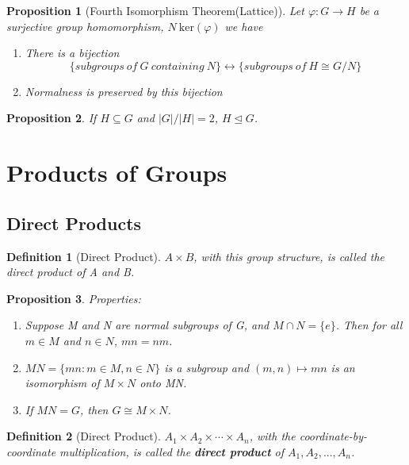\documentclass[12pt]{article}
\newtheorem{definition}{Definition}[subsection]
\newtheorem{proposition}{Proposition}[subsection]
\begin{document}
      \begin{proposition}[Fourth Isomorphism Theorem(Lattice)]
      	Let $\varphi: G \rightarrow H$ be a surjective group homomorphism, $N \ \mathrm{ker}(\varphi)$
      	we have 
      	\begin{enumerate}
      		\item There is a bijection \[\{subgroups\ of\ G\ containing\ N\} \leftrightarrow \{subgroups\ of\ H \cong G/N\}\]
      		\item Normalness is preserved by this bijection
      	\end{enumerate}
      \end{proposition}
      
      \begin{proposition}
      	If $H \subseteq G$ and $|G| / |H| = 2$, $H \unlhd G$.
      \end{proposition}  
        
        
    \section{Products of Groups}
    \subsection{Direct Products}
    \begin{definition}[Direct Product]
        $A \times B$, with this group structure, is called the direct product of A and B.
    \end{definition}
    \begin{proposition}
        Properties:
            \begin{enumerate}
                \item Suppose M and N are normal subgroups of G, and $M \cap N = \{e\}$. Then for all $m \in M$ and $n \in N$, $mn = nm$.
                \item $MN = \{mn: m \in M, n \in N\}$ is a subgroup and $(m, n) \mapsto mn$ is an isomorphism of $M \times N$ onto MN.
                \item If $MN = G$, then $G \cong M \times N$.
            \end{enumerate}
    \end{proposition}
    \begin{definition}[Direct Product]
        $A_1 \times A_2 \times \cdots \times A_n$, with the coordinate-by-coordinate multiplication, is called the \textbf{direct product} of $A_1, A_2, ..., A_n$.
    \end{definition}
\end{document}
